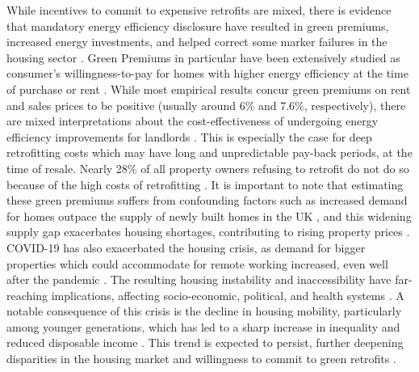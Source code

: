 While incentives to commit to expensive retrofits are mixed, there is evidence that mandatory energy efficiency disclosure have resulted in green premiums, increased energy investments, and helped correct some marker failures in the housing sector \cite{cassidy_how_2023, myers_mandatory_2022}. Green Premiums in particular have been extensively studied as consumer’s willingness-to-pay for homes with higher energy efficiency at the time of purchase \cite{harrison_hedonic_1978, bisello_measuring_2020, dalton_green_2018, ghosh_homebuyers_2024, fuerst_is_2020, kahn_capitalization_2014} or rent \cite{bruegge_does_2016, galvin_rental_2023, sieger_inefficient_2023}. While most empirical results concur green premiums on rent and sales prices to be positive (usually around 6\% and 7.6\%, respectively), there are mixed interpretations about the cost-effectiveness of undergoing energy efficiency improvements for landlords \cite{dalton_green_2018}. This is especially the case for deep retrofitting costs which may have long and unpredictable pay-back periods, at the time of resale. Nearly 28\% of all property owners refusing to retrofit do not do so because of the high costs of retrofitting \cite{office_for_national_statistics_age_2022}. It is important to note that estimating these green premiums suffers from confounding factors such as increased demand for homes outpace the supply of newly built homes in the UK \cite{aldridge_housing_2018, nazir_comparison_2020}, and this widening supply gap exacerbates housing shortages, contributing to rising property prices \cite{green_policies_2017}. COVID-19 has also exacerbated the housing crisis, as demand for bigger properties which could accommodate for remote working increased, even well after the pandemic \cite{schwartz_covid-19s_2023}. The resulting housing instability and inaccessibility have far-reaching implications, affecting socio-economic, political, and health systems \cite{murphy_housing_2024, bone_neoliberal_2014, banks_house_2010, mckee_generation_2020}. A notable consequence of this crisis is the decline in housing mobility, particularly among younger generations, which has led to a sharp increase in inequality and reduced disposable income \cite{howard_seven_2024}. This trend is expected to persist, further deepening disparities in the housing market and willingness to commit to green retrofits \cite{green_policies_2017, sabater_age_2023}. \\

